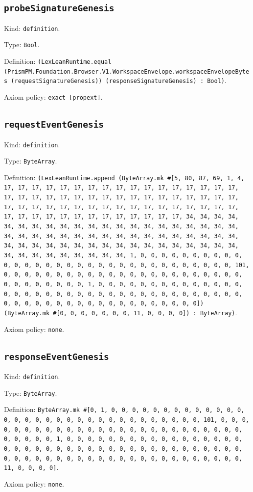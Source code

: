 \documentclass[11pt]{article}
\begin{document}
\subsection*{\texttt{probeSignatureGenesis}}
\noindent Kind: \texttt{definition}.\par
\noindent Type: \texttt{Bool}.\par
\noindent Definition: \texttt{(LexLeanRuntime.equal (PrismPM.Foundation.Browser.V1.WorkspaceEnvelope.workspaceEnvelopeBytes (requestSignatureGenesis)) (responseSignatureGenesis) : Bool)}.\par
\noindent Axiom policy: \texttt{exact [propext]}.\par
\subsection*{\texttt{requestEventGenesis}}
\noindent Kind: \texttt{definition}.\par
\noindent Type: \texttt{ByteArray}.\par
\noindent Definition: \texttt{(LexLeanRuntime.append (ByteArray.mk \#[5, 80, 87, 69, 1, 4, 17, 17, 17, 17, 17, 17, 17, 17, 17, 17, 17, 17, 17, 17, 17, 17, 17, 17, 17, 17, 17, 17, 17, 17, 17, 17, 17, 17, 17, 17, 17, 17, 17, 17, 17, 17, 17, 17, 17, 17, 17, 17, 17, 17, 17, 17, 17, 17, 17, 17, 17, 17, 17, 17, 17, 17, 17, 17, 17, 17, 17, 17, 17, 17, 34, 34, 34, 34, 34, 34, 34, 34, 34, 34, 34, 34, 34, 34, 34, 34, 34, 34, 34, 34, 34, 34, 34, 34, 34, 34, 34, 34, 34, 34, 34, 34, 34, 34, 34, 34, 34, 34, 34, 34, 34, 34, 34, 34, 34, 34, 34, 34, 34, 34, 34, 34, 34, 34, 34, 34, 34, 34, 34, 34, 34, 34, 34, 34, 1, 0, 0, 0, 0, 0, 0, 0, 0, 0, 0, 0, 0, 0, 0, 0, 0, 0, 0, 0, 0, 0, 0, 0, 0, 0, 0, 0, 0, 0, 0, 0, 0, 101, 0, 0, 0, 0, 0, 0, 0, 0, 0, 0, 0, 0, 0, 0, 0, 0, 0, 0, 0, 0, 0, 0, 0, 0, 0, 0, 0, 0, 0, 0, 0, 1, 0, 0, 0, 0, 0, 0, 0, 0, 0, 0, 0, 0, 0, 0, 0, 0, 0, 0, 0, 0, 0, 0, 0, 0, 0, 0, 0, 0, 0, 0, 0, 0, 0, 0, 0, 0, 0, 0, 0, 0, 0, 0, 0, 0, 0, 0, 0, 0, 0, 0, 0, 0, 0, 0, 0, 0]) (ByteArray.mk \#[0, 0, 0, 0, 0, 0, 0, 11, 0, 0, 0, 0]) : ByteArray)}.\par
\noindent Axiom policy: \texttt{none}.\par
\subsection*{\texttt{responseEventGenesis}}
\noindent Kind: \texttt{definition}.\par
\noindent Type: \texttt{ByteArray}.\par
\noindent Definition: \texttt{ByteArray.mk \#[0, 1, 0, 0, 0, 0, 0, 0, 0, 0, 0, 0, 0, 0, 0, 0, 0, 0, 0, 0, 0, 0, 0, 0, 0, 0, 0, 0, 0, 0, 0, 0, 0, 0, 101, 0, 0, 0, 0, 0, 0, 0, 0, 0, 0, 0, 0, 0, 0, 0, 0, 0, 0, 0, 0, 0, 0, 0, 0, 0, 0, 0, 0, 0, 0, 0, 1, 0, 0, 0, 0, 0, 0, 0, 0, 0, 0, 0, 0, 0, 0, 0, 0, 0, 0, 0, 0, 0, 0, 0, 0, 0, 0, 0, 0, 0, 0, 0, 0, 0, 0, 0, 0, 0, 0, 0, 0, 0, 0, 0, 0, 0, 0, 0, 0, 0, 0, 0, 0, 0, 0, 0, 0, 0, 0, 0, 0, 0, 0, 0, 11, 0, 0, 0, 0]}.\par
\noindent Axiom policy: \texttt{none}.\par
\end{document}
